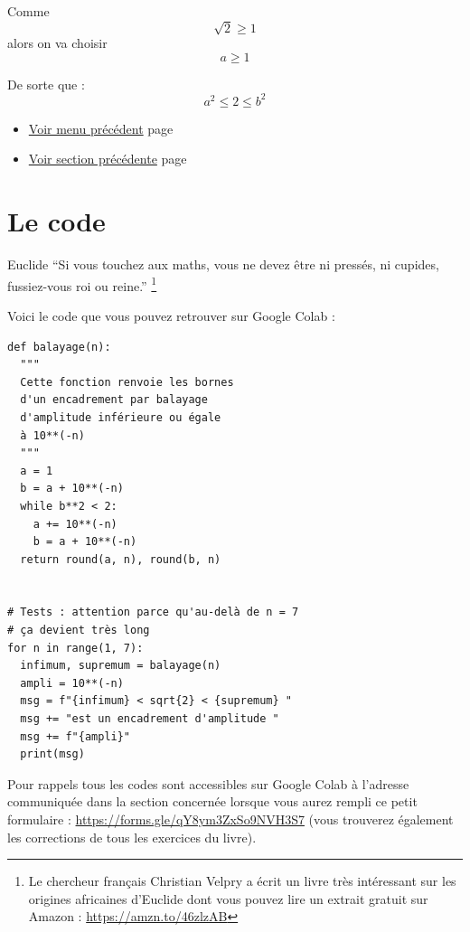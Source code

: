 \documentclass[a4paper,11pt]{book}
\begin{document}
Comme
\[\sqrt{2} \geq 1\]
alors on va choisir
\[a \geq 1\]

De sorte que :
\[a^2 \leq 2 \leq b^2\]

\begin{itemize}
\item \hyperref[org3aca2a1]{Voir menu précédent}
page~\pageref{page:algos-menu}
\item \hyperref[org06c5a30]{Voir section précédente}
page~\pageref{page:sec5.1review}
\end{itemize}

\clearpage

\chapter{Le code}
\label{sec:org89799dd}
\label{orgb14e38d}
\label{page:sec5.3code}

\begin{myquote}{Euclide}
\enquote{Si vous touchez aux maths, vous ne devez être ni pressés, ni
cupides, fussiez-vous roi ou reine.}
\footnote{Le chercheur français Christian Velpry a écrit un livre
très intéressant sur les origines africaines d'Euclide dont vous
pouvez lire un extrait gratuit sur Amazon : \url{https://amzn.to/46zlzAB}}
\end{myquote}


\clearpage

Voici le code que vous pouvez retrouver sur Google Colab :

\begin{verbatim}
def balayage(n):
  """
  Cette fonction renvoie les bornes
  d'un encadrement par balayage
  d'amplitude inférieure ou égale
  à 10**(-n)
  """
  a = 1
  b = a + 10**(-n)
  while b**2 < 2:
    a += 10**(-n)
    b = a + 10**(-n)
  return round(a, n), round(b, n)


# Tests : attention parce qu'au-delà de n = 7
# ça devient très long 
for n in range(1, 7):
  infimum, supremum = balayage(n)
  ampli = 10**(-n)
  msg = f"{infimum} < sqrt{2} < {supremum} "
  msg += "est un encadrement d'amplitude "
  msg += f"{ampli}"
  print(msg)
\end{verbatim}

\clearpage

Pour rappels tous les codes sont accessibles sur Google Colab à
l'adresse communiquée dans la section concernée lorsque vous
aurez rempli ce petit formulaire : \url{https://forms.gle/qY8ym3ZxSo9NVH3S7}
(vous trouverez également les corrections de tous les exercices du
livre).
\end{document}
